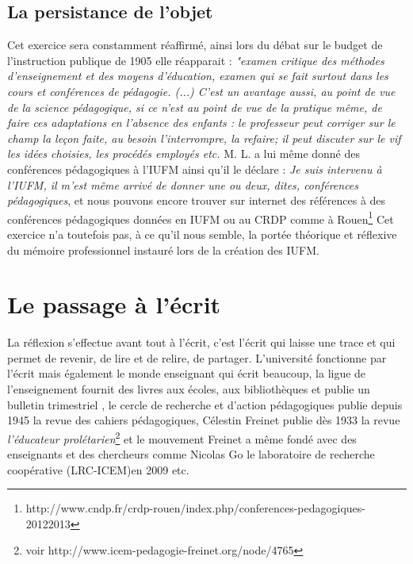 \documentclass[a4paper,11pt]{article}
\begin{document}
			\subsection{La persistance de l'objet}
			Cet exercice sera constamment réaffirmé, ainsi lors du débat sur le budget de l'instruction publique de 1905 elle réapparait : \emph{"examen critique des méthodes d'enseignement et des moyens d'éducation, examen qui se fait surtout dans les cours et conférences de pédagogie. (...) C'est un avantage aussi, au point de vue de la science pédagogique, si ce n'est au point de vue de la pratique même, de faire ces adaptations en l'absence des enfants : le professeur peut corriger sur le champ la leçon faite, au besoin l'interrompre, la refaire; il peut discuter sur le vif les idées choisies, les procédés employés etc.} M. L. a lui même donné des conférences pédagogiques à l'IUFM ainsi qu'il le déclare : \emph{Je suis intervenu à l'IUFM, il m'est même arrivé de donner une ou deux, dites, conférences pédagogiques}, et nous pouvons encore trouver sur internet des références à des conférences pédagogiques données en IUFM ou au CRDP comme à Rouen\footnote{http://www.cndp.fr/crdp-rouen/index.php/conferences-pedagogiques-20122013}
			Cet exercice n'a toutefois pas, à ce qu'il nous semble, la portée théorique et réflexive du mémoire professionnel instauré lors de la création des IUFM.
			\section{Le passage à l'écrit}
			La réflexion s'effectue avant tout à l'écrit, c'est l'écrit qui laisse une trace et qui permet de revenir, de lire et de relire, de partager. L'université fonctionne par l'écrit mais également le monde enseignant qui écrit beaucoup, la ligue de l'enseignement fournit des livres aux écoles, aux bibliothèques et publie un bulletin trimestriel \cite{bui11}, le cercle de recherche et d'action pédagogiques publie depuis 1945 la revue des cahiers pédagogiques, Célestin Freinet publie dès 1933 la revue \emph{l'éducateur prolétarien}\footnote{voir http://www.icem-pedagogie-freinet.org/node/4765} et le mouvement Freinet a même fondé avec des enseignants et des chercheurs comme Nicolas Go le laboratoire de recherche coopérative (LRC-ICEM)en 2009 etc.
\end{document}
